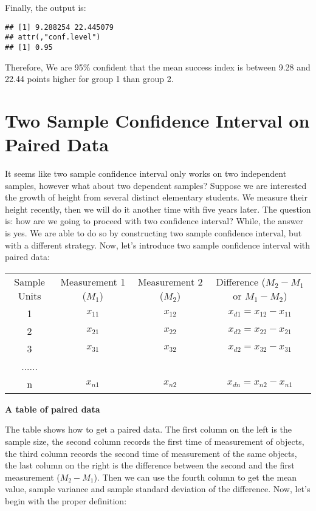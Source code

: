 Finally, the output is:

\begin{tcolorbox}[colback=gray!10, colframe=gray!50, arc=2mm]
\begin{verbatim}
## [1] 9.288254 22.445079 
## attr(,"conf.level") 
## [1] 0.95
\end{verbatim}
\end{tcolorbox}

Therefore, We are 95\% conﬁdent that the mean success index is between 9.28 and 22.44 points higher for group 1 than group 2.

\section{Two Sample Confidence Interval on Paired Data}

It seems like two sample confidence interval only works on two independent samples, however what about two dependent samples? Suppose we are interested the growth of height from several distinct elementary students. We measure their height recently, then we will do it another time with five years later. The question is: how are we going to proceed with two confidence interval? While, the answer is yes. We are able to do so by constructing two sample confidence interval, but with a different strategy. Now, let's introduce two sample confidence interval with paired data:

\begin{center}
\begin{tabular}{ c c c c }
 Sample Units & Measurement 1 ($M_1$) & Measurement 2 ($M_2$) & Difference ($M_2 - M_1$ or $M_1 - M_2$)\\ 
 1 & $x_{11}$ & $x_{12}$ & $x_{d1} = x_{12} -  x_{11}$\\  
 2 & $x_{21}$ & $x_{22}$ & $x_{d2} = x_{22} -  x_{21}$\\
 3 & $x_{31}$ & $x_{32}$ & $x_{d2} = x_{32} -  x_{31}$\\
 ......\\
 n & $x_{n1}$ & $x_{n2}$ & $x_{dn} = x_{n2} -  x_{n1}$\\
\end{tabular}
\small\textbf{A table of paired data}\\
\end{center}

The table shows how to get a paired data. The first column on the left is the sample size, the second column records the first time of measurement of objects, the third column records the second time of measurement of the same objects, the last column on the right is the difference between the second and the first measurement ($M_2 - M_1$). Then we can use the fourth column to get the mean value, sample variance and sample standard deviation of the difference. Now, let's begin with the proper definition:

